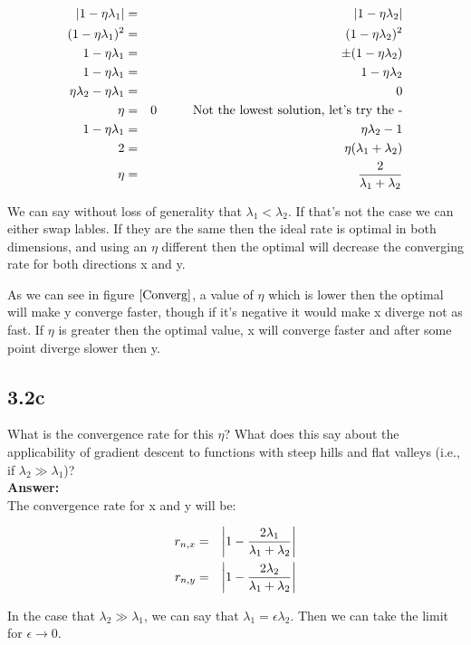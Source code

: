 \documentclass[a4paper]{article}
\newcommand\tab[1][1cm]{\hspace*{#1}}
\begin{document}
\begin{eqnarray}
\abs{1-\eta \lambda_1} &=& \abs{1-\eta \lambda_2}\\
(1-\eta \lambda_1)^2 &=& (1- \eta \lambda_2)^2\\
1 - \eta \lambda_1 &=& \pm (1-\eta \lambda_2)\\
1 - \eta \lambda_1 &=& 1 - \eta \lambda_2\\
\eta \lambda_2 - \eta \lambda_1 &=& 0 \\
\eta &=& 0 \tab \text{Not the lowest solution, let's try the -}\\
1 - \eta \lambda_1 &=& \eta \lambda_2 - 1\\
2 &=& \eta (\lambda_1 + \lambda_2)\\
\eta &=& \frac{2}{\lambda_1 + \lambda_2}
\end{eqnarray}

We can say without loss of generality that $\lambda_1 < \lambda_2$. If that's not the case we can either swap lables. If they are the same then the ideal rate is optimal in both dimensions, and using an $\eta$ different then the optimal will decrease the converging rate for both directions x and y.

As we can see in figure $\ref{Converg}$, a value of $\eta$ which is lower then the optimal will make y converge faster, though if it's negative it would make x diverge not as fast. If $\eta$ is greater then the optimal value, x will converge faster and after some point diverge slower then y.

\newpage
\subsection*{3.2c}

What is the convergence rate for this $\eta$? What does this say about the applicability of
gradient descent to functions with steep hills and flat valleys (i.e., if $\lambda_2 \gg \lambda_1$)?\\

\textbf{Answer:}\\

The convergence rate for x and y  will be:

\begin{eqnarray}
r_{n,x} &=& \abs{1 - \frac{2\lambda_1}{\lambda_1 + \lambda_2}}\\
r_{n,y} &=& \abs{1 - \frac{2\lambda_2}{\lambda_1 + \lambda_2}}
\end{eqnarray}

In the case that $\lambda_2 \gg \lambda_1$, we can say that $\lambda_1 = \epsilon \lambda_2$. Then we can take the limit for $\epsilon \rightarrow 0$.
\end{document}
